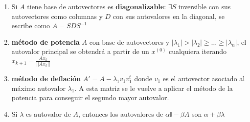 \begin{enumerate}
    \item Si $A$ tiene base de autovectores es \textbf{diagonalizable}: $\exists S$ inversible con sus autovectores como columnas  y $D$ con sus autovalores en la diagonal, se escribe como $A = SDS^{-1}$
    \item \textbf{método de potencia} $A$ con base de autovectores y $|\lambda_1| > |\lambda_2| \geq \dots \geq |\lambda_n|$, el autovalor principal se obtendrá a partir de un $x^{(0)}$ cualquiera iterando $x_{k+1} = \frac{Ax_k}{||Ax_k||}$
    \item \textbf{método de deflación} $A' = A - \lambda_1 v_1 v_1^t$ donde $v_1$ es el autovector asociado al máximo autovalor $\lambda_1$. A esta matriz se le vuelve a aplicar el método de la potencia para conseguir el segundo mayor autovalor.
    \item Si $\lambda$ es autovalor de $A$, entonces los autovalores de $\alpha\mathbb{I}-\beta A$ son $\alpha+\beta \lambda$ 
\end{enumerate}

